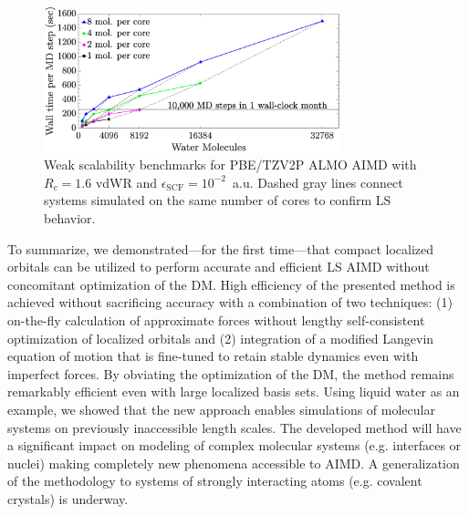 \documentclass[aip,jcp,reprint,amsmath,amssymb]{revtex4-1}
\begin{document}
\begin{figure}
\includegraphics[trim={1.6cm 0.8cm 4.7cm 0cm},clip,width=8.6cm]{4.eps}
\caption{\label{fig:weakscaling} Weak scalability benchmarks for PBE/TZV2P ALMO AIMD with  $R_{c} = 1.6$ vdWR and $\epsilon_{\text{SCF}} = 10^{-2}$~a.u. 
Dashed gray lines connect systems simulated on the same number of cores to confirm LS behavior. %
}
\end{figure}


To summarize, we demonstrated---for the first time---that compact localized orbitals can be utilized to perform accurate and efficient LS AIMD without concomitant optimization of the DM. %
High efficiency of the presented method is achieved without sacrificing accuracy with a combination of two techniques: (1) on-the-fly calculation of approximate forces without lengthy self-consistent optimization of localized orbitals and (2) integration of a modified Langevin equation of motion that is fine-tuned to retain stable dynamics even with imperfect forces. 
By obviating the optimization of the DM, the method remains remarkably efficient even with large localized basis sets. 
Using liquid water as an example, we showed that the new approach enables simulations of molecular systems on previously inaccessible length scales. 
The developed method will have a significant impact on modeling of complex molecular systems (e.g. interfaces or nuclei) making completely new phenomena accessible to AIMD. 
A generalization of the methodology to systems of strongly interacting atoms (e.g. covalent crystals) is underway.


\end{document}
